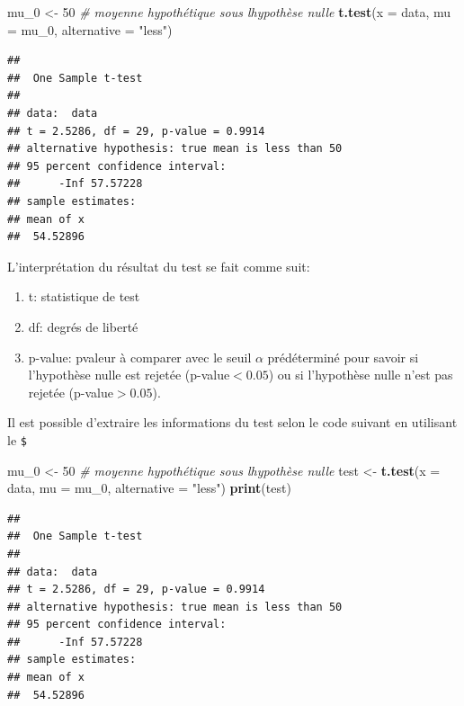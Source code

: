 \documentclass[
]{book}
\newenvironment{Shaded}{\begin{snugshade}}{\end{snugshade}}
\newcommand{\AttributeTok}[1]{\textcolor[rgb]{0.13,0.29,0.53}{#1}}
\newcommand{\CommentTok}[1]{\textcolor[rgb]{0.56,0.35,0.01}{\textit{#1}}}
\newcommand{\DecValTok}[1]{\textcolor[rgb]{0.00,0.00,0.81}{#1}}
\newcommand{\FunctionTok}[1]{\textcolor[rgb]{0.13,0.29,0.53}{\textbf{#1}}}
\newcommand{\NormalTok}[1]{#1}
\newcommand{\OtherTok}[1]{\textcolor[rgb]{0.56,0.35,0.01}{#1}}
\newcommand{\StringTok}[1]{\textcolor[rgb]{0.31,0.60,0.02}{#1}}
\providecommand{\tightlist}{%
  \setlength{\itemsep}{0pt}\setlength{\parskip}{0pt}}
\begin{document}
\begin{Shaded}
\begin{Highlighting}[]
\NormalTok{mu\_0 }\OtherTok{\textless{}{-}} \DecValTok{50}  \CommentTok{\# moyenne hypothétique sous l\textquotesingle{}hypothèse nulle }
\FunctionTok{t.test}\NormalTok{(}\AttributeTok{x =}\NormalTok{ data, }\AttributeTok{mu =}\NormalTok{ mu\_0, }\AttributeTok{alternative =} \StringTok{"less"}\NormalTok{)}
\end{Highlighting}
\end{Shaded}

\begin{verbatim}
## 
##  One Sample t-test
## 
## data:  data
## t = 2.5286, df = 29, p-value = 0.9914
## alternative hypothesis: true mean is less than 50
## 95 percent confidence interval:
##      -Inf 57.57228
## sample estimates:
## mean of x 
##  54.52896
\end{verbatim}

L'interprétation du résultat du test se fait comme suit:

\begin{enumerate}
\def\labelenumi{\arabic{enumi}.}
\tightlist
\item
  t: statistique de test
\item
  df: degrés de liberté
\item
  p-value: pvaleur à comparer avec le seuil \(\alpha\) prédéterminé pour savoir si l'hypothèse nulle est rejetée (p-value\(<0.05\)) ou si l'hypothèse nulle n'est pas rejetée (p-value\(>0.05\)).
\end{enumerate}

Il est possible d'extraire les informations du test selon le code suivant en utilisant le \texttt{\$}

\begin{Shaded}
\begin{Highlighting}[]
\NormalTok{mu\_0 }\OtherTok{\textless{}{-}} \DecValTok{50}  \CommentTok{\# moyenne hypothétique sous l\textquotesingle{}hypothèse nulle }
\NormalTok{test }\OtherTok{\textless{}{-}} \FunctionTok{t.test}\NormalTok{(}\AttributeTok{x =}\NormalTok{ data, }\AttributeTok{mu =}\NormalTok{ mu\_0, }\AttributeTok{alternative =} \StringTok{"less"}\NormalTok{)}
\FunctionTok{print}\NormalTok{(test)}
\end{Highlighting}
\end{Shaded}

\begin{verbatim}
## 
##  One Sample t-test
## 
## data:  data
## t = 2.5286, df = 29, p-value = 0.9914
## alternative hypothesis: true mean is less than 50
## 95 percent confidence interval:
##      -Inf 57.57228
## sample estimates:
## mean of x 
##  54.52896
\end{verbatim}
\end{document}
